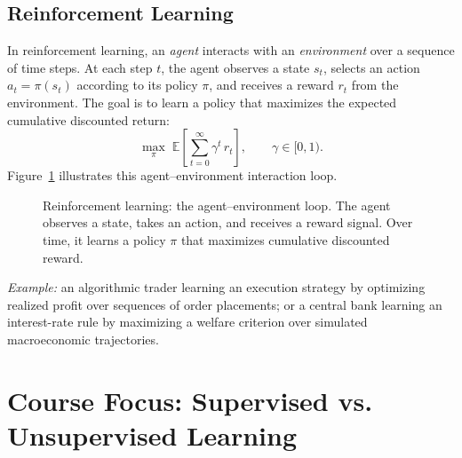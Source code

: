 \documentclass[11pt,a4paper]{report}
\begin{document}
\subsection{Reinforcement Learning}

In reinforcement learning, an \emph{agent} interacts with an \emph{environment} over a sequence of time steps.  At each step $t$, the agent observes a state $s_t$, selects an action $a_t = \pi(s_t)$ according to its policy $\pi$, and receives a reward $r_t$ from the environment.  The goal is to learn a policy that maximizes the expected cumulative discounted return:
\[
    \max_{\pi}\; \mathbb{E}\!\left[\sum_{t=0}^{\infty} \gamma^t \, r_t\right], \qquad \gamma \in [0,1).
\]
Figure~\ref{fig:rl-loop} illustrates this agent--environment interaction loop.

\begin{figure}[ht]
\centering
{}
\caption{Reinforcement learning: the agent--environment loop.  The agent observes a state, takes an action, and receives a reward signal.  Over time, it learns a policy $\pi$ that maximizes cumulative discounted reward.}
\label{fig:rl-loop}
\end{figure}

\noindent \emph{Example:} an algorithmic trader learning an execution strategy by optimizing realized profit over sequences of order placements; or a central bank learning an interest-rate rule by maximizing a welfare criterion over simulated macroeconomic trajectories.

\section{Course Focus: Supervised vs. Unsupervised Learning}
\end{document}
